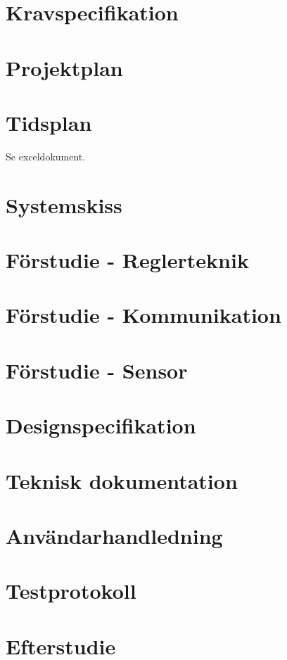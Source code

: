 \documentclass[11pt]{article}
\begin{document}
\section{Kravspecifikation}


\section{Projektplan}


\section{Tidsplan}
Se exceldokument.

\section{Systemskiss}


\section{Förstudie - Reglerteknik}


\section{Förstudie - Kommunikation}


\section{Förstudie - Sensor}


\section{Designspecifikation}


\section{Teknisk dokumentation}


\section{Användarhandledning}


\section{Testprotokoll}





\section{Efterstudie}

\end{document}
